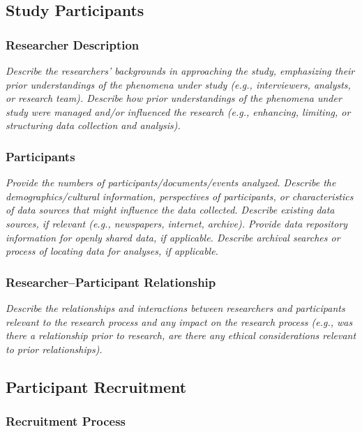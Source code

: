 \documentclass[acmsmall]{acmart}
\begin{document}
\subsection{Study Participants}

\subsubsection{Researcher Description}

{\em\small Describe the researchers’ backgrounds in approaching the study, emphasizing their prior understandings of the phenomena under study (e.g., interviewers, analysts, or research team). Describe how prior understandings of the phenomena under study were managed and/or influenced the research (e.g., enhancing, limiting, or structuring data collection and analysis).}

\subsubsection{Participants}

{\em\small Provide the numbers of participants/documents/events analyzed. Describe the demographics/cultural information, perspectives of participants, or characteristics of data sources that might influence the data collected. Describe existing data sources, if relevant (e.g., newspapers, internet, archive). Provide data repository information for openly shared data, if applicable. Describe archival searches or process of locating data for analyses, if applicable. }


\subsubsection{Researcher–Participant Relationship}

{\em\small  Describe the relationships and interactions between researchers and participants relevant to the research process and any impact on the research process (e.g., was there a relationship prior to research, are there any ethical considerations relevant to prior relationships). }


\subsection{Participant Recruitment}
\subsubsection{Recruitment Process}
\end{document}
